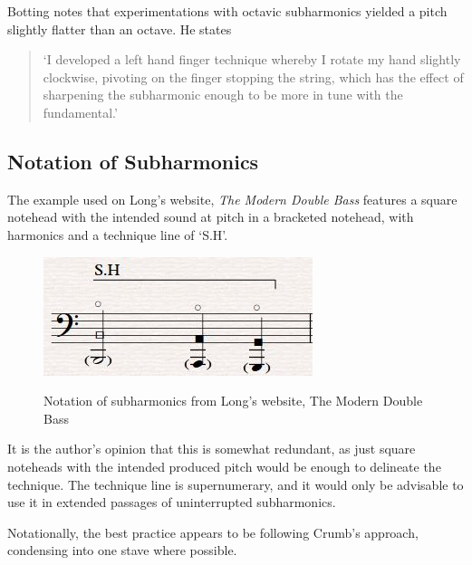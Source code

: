   Botting notes that experimentations with octavic subharmonics yielded a pitch slightly flatter than an octave. He states \begin{quotation}
    `I developed a left hand finger technique whereby I rotate my hand slightly clockwise, pivoting on the finger stopping the string, which has the effect of sharpening the subharmonic enough to be more in tune with the fundamental.'\autocite[111]{bottingDevelopingPersonalVocabulary2019}
\end{quotation}



\subsection{Notation of Subharmonics}

The example used on Long's website, \emph{The Modern Double Bass} features a square notehead with the intended sound at pitch in a bracketed notehead, with harmonics and a technique line of `S.H'.\autocite[]{longSubharmonics2019}

\begin{figure}
  \includegraphics[width=\linewidth]{./resources/longSubharmonicNotation.jpg}
  \caption{Notation of subharmonics from Long's website, The Modern Double Bass}\autocite[]{longSubharmonics2019}
\label{fig:Notation of subharmonics from Long's website, The Modern Double Bass}
\end{figure}

It is the author's opinion that this is somewhat redundant, as just square noteheads with the intended produced pitch would be enough to delineate the technique. 
The technique line is supernumerary, and it would only be advisable to use it in extended passages of uninterrupted subharmonics.

Notationally, the best practice appears to be following Crumb's approach, condensing into one stave where possible. 

